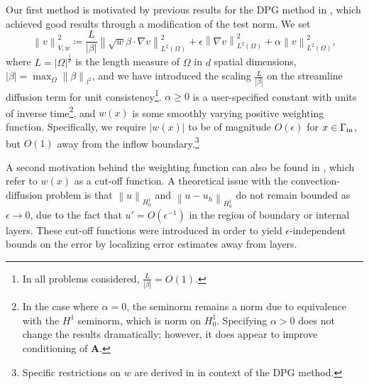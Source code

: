 \documentclass[final,leqno]{siamltex}
\newcommand{\bs}[1]{\boldsymbol{#1}}
\newcommand{\nor}[1]{\left\| #1 \right\|}
\newcommand{\LRp}[1]{\left( #1 \right)}
\newcommand{\LRb}[1]{\left| #1 \right|}
\newcommand{\Grad} {\ensuremath{\nabla}}
\renewcommand{\L}{L^2\LRp{\Omega}}
\begin{document}
Our first method is motivated by previous results for the DPG method in \cite{DPGrobustness}, which achieved good results through a modification of the test norm.  We set
\[
\nor{v}_{V,w}^2 \coloneqq \frac{L}{\LRb{\beta}}\nor{\sqrt{w}\beta\cdot \Grad v}_{\L}^2 + \epsilon\nor{\Grad v}_{\L}^2 + \alpha\nor{v}_{\L}^2,
\]
where $L = \LRb{\Omega}^{\frac{1}{d}}$ is the length measure of $\Omega$ in $d$ spatial dimensions, $\LRb{\beta} = \max_\Omega \nor{\beta}_{l^2}$, and we have introduced the scaling $\frac{L}{\LRb{\beta}}$ on the streamline diffusion term for unit consistency\footnote{In all problems considered, $\frac{L}{\LRb{\beta}} = O(1)$.}. $\alpha \geq 0$ is a user-specified constant with units of inverse time\footnote{In the case where $\alpha = 0$, the seminorm remains a norm due to equivalence with the $H^1$ seminorm, which is norm on $H^1_0$.  Specifying $\alpha > 0$ does not change the results dramatically; however, it does appear to improve conditioning of $\bs{A}$.}, and $w(x)$ is some smoothly varying positive weighting function.  Specifically, we require $\LRb{w(x)}$ to be of magnitude $O(\epsilon)$ for $x\in \Gamma_{\rm in}$, but $O(1)$ away from the inflow boundary.\footnote{Specific restrictions on $w$ are derived in \cite{DPGrobustness} in context of the DPG method.}

A second motivation behind the weighting function can also be found in \cite{stynesSUPG, roos2008robust, johnsonCrosswind}, which refer to $w(x)$ as a cut-off function.  A theoretical issue with the convection-diffusion problem is that $\nor{u}_{H^1_0}$ and $\nor{u-u_h}_{H^1_0}$ do not remain bounded as $\epsilon\rightarrow 0$, due to the fact that $u' = O(\epsilon^{-1})$ in the region of boundary or internal layers.  These cut-off functions were introduced in order to yield $\epsilon$-independent bounds on the error by localizing error estimates away from layers.
\end{document}
